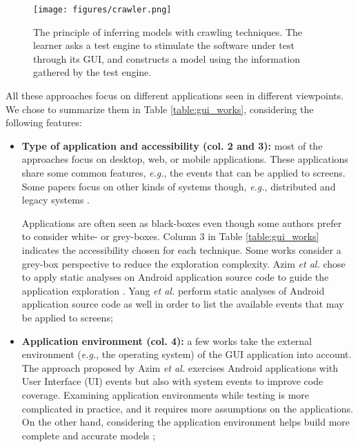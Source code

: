 \begin{figure}[ht]
    \begin{center}
        \texttt{[image: figures/crawler.png]}
    \end{center}

    \caption{The principle of inferring models with crawling
    techniques. The learner asks a test engine to stimulate the
	software under test through its GUI, and constructs a model
	using the information gathered by the test engine.}
    \label{fig:crawler}
\end{figure}

All these approaches focus on different applications seen in
different viewpoints. We chose to summarize them in Table
\ref{table:gui_works}, considering the following features:

\begin{itemize}
	\item \textbf{Type of application and accessibility (col.
	2 and 3):} most of the approaches focus on desktop, web, or
	mobile applications. These applications share some common
	features, \emph{e.g.}, the events that can be applied to screens.
	Some papers focus on other kinds of systems though, \emph{e.g.},
	distributed and legacy systems \cite{hungar2002}.

    Applications are often seen as black-boxes even though some
    authors prefer to consider white- or grey-boxes. Column 3 in
    Table \ref{table:gui_works} indicates the accessibility
    chosen for each technique. Some works consider a grey-box
    perspective to reduce the exploration complexity. Azim
    \emph{et al.} chose to apply static analyses on Android
    application source code to guide the application exploration
    \cite{Azim13}. Yang \emph{et al.} \cite{WPX13} perform static
    analyses of Android application source code as well in order
    to list the available events that may be applied to screens;

	\item \textbf{Application environment (col. 4):} a few works
	\cite{Azim13,SP15} take the external environment (\emph{e.g.}, the
	operating system) of the GUI application into account.
	The approach proposed by Azim \emph{et al.} \cite{Azim13} exercises
	Android applications with User Interface (UI) events but also
	with system events to improve code coverage. Examining
	application environments while testing is more complicated in
	practice, and it requires more assumptions on the
    applications. On the other hand, considering the application
    environment helps build more complete and accurate models
    \cite{SP15};



\end{itemize}
